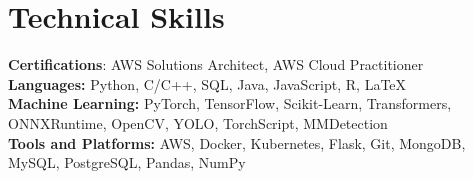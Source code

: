 \documentclass[letterpaper,11pt]{article}
\begin{document}
\section{Technical Skills}
  \begin{itemize}[leftmargin=0.15in, label={}]
    \small{\item{
      \textbf{Certifications}: AWS Solutions Architect, AWS Cloud Practitioner \\
      \textbf{Languages:}{ Python, C/C++, SQL, Java, JavaScript, R, LaTeX} \\
      \textbf{Machine Learning:}{ PyTorch, TensorFlow, Scikit-Learn, Transformers, ONNXRuntime, OpenCV, YOLO, TorchScript, MMDetection} \\
      \textbf{Tools and Platforms:}{ AWS, Docker, Kubernetes, Flask, Git, MongoDB, MySQL, PostgreSQL, Pandas, NumPy}
    }}
  \end{itemize}
\end{document}
